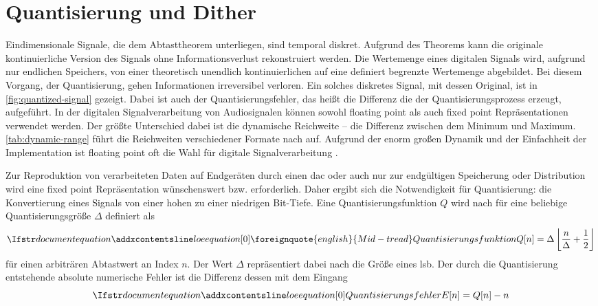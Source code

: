 
\cleartoleftpage

\thispagestyle{empty}
\vspace*{\fill}
\newpage

\onehalfspacing
{}
\setcounter{page}{1}
\pagestyle{scrheadings}

\section{Quantisierung und Dither}

Eindimensionale Signale, die dem \citeauthor{shannon} Abtasttheorem \autocite{shannon} unterliegen, sind temporal diskret.
Aufgrund des Theorems kann die originale kontinuierliche Version des Signals ohne Informationsverlust rekonstruiert werden.
Die Wertemenge eines digitalen Signals wird, aufgrund nur endlichen Speichers, von einer theoretisch unendlich kontinuierlichen auf eine definiert begrenzte Wertemenge abgebildet.
Bei diesem Vorgang, der Quantisierung, gehen Informationen irreversibel verloren.
Ein solches diskretes Signal, mit dessen Original, ist in \autoref{fig:quantized-signal} gezeigt.
Dabei ist auch der Quantisierungsfehler, das heißt die Differenz die der Quantisierungsprozess erzeugt, aufgeführt.
In der digitalen Signalverarbeitung von Audiosignalen können sowohl \gls{floating point} als auch \gls{fixed point} Repräsentationen verwendet werden.
Der größte Unterschied dabei ist die dynamische Reichweite -- die Differenz zwischen dem Minimum und Maximum.
\autoref{tab:dynamic-range} führt die Reichweiten verschiedener Formate nach \citeauthor{dsp-guide} auf.
Aufgrund der enorm großen Dynamik und der Einfachheit der Implementation ist \gls{floating point} oft die Wahl für digitale Signalverarbeitung \autocite[S. 68ff]{dsp-guide}.

Zur Reproduktion von verarbeiteten Daten auf Endgeräten durch einen \gls{dac} oder auch nur zur endgültigen Speicherung oder Distribution wird eine \gls{fixed point} Repräsentation wünschenswert bzw. erforderlich.
Daher ergibt sich die Notwendigkeit für Quantisierung: die Konvertierung eines Signals von einer hohen zu einer niedrigen Bit-Tiefe.
Eine Quantisierungsfunktion $Q$ wird nach \citeauthor{dither} für eine beliebige Quantisierungsgröße $\Delta$ definiert als
\begin{equation}
    \setequationentry{\foreignquote{english}{Mid-tread} Quantisierungsfunktion}
    Q[n] = \Delta \left\lfloor \frac{n}{\Delta} + \frac{1}{2} \right\rfloor
\end{equation}
für einen arbiträren Abtastwert an Index $n$.
Der Wert $\Delta$ repräsentiert dabei nach \citeauthor{dither} die Größe eines \gls{lsb}.
Der durch die Quantisierung entstehende absolute numerische Fehler ist die Differenz dessen mit dem Eingang
\begin{equation}
\setequationentry{Quantisierungsfehler}
E[n] = Q[n] - n
\end{equation}


